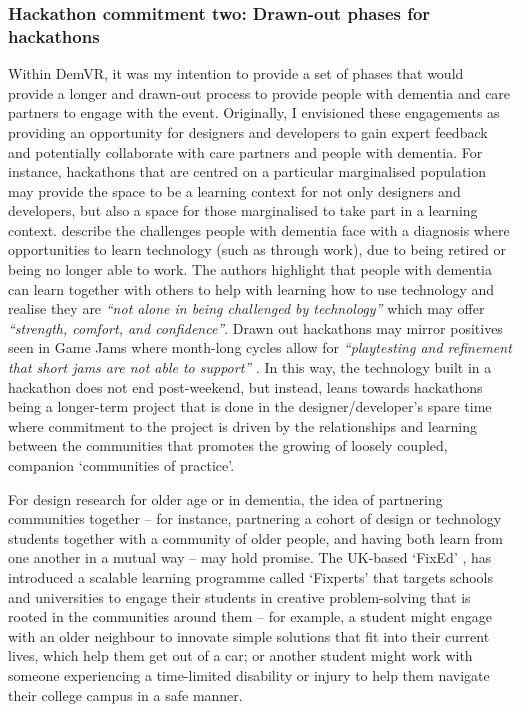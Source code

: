 \subsubsection{Hackathon commitment two: Drawn-out phases for hackathons}
\label{DiscussionThree:CommitTwo}
Within DemVR, it was my intention to provide a set of phases that would provide a longer and drawn-out process to provide people with dementia and care partners to engage with the event. Originally, I envisioned these engagements as providing an opportunity for designers and developers to gain expert feedback and potentially collaborate with care partners and people with dementia. For instance, hackathons that are centred on a particular marginalised population may provide the space to be a learning context for not only designers and developers, but also a space for those marginalised to take part in a learning context. \cite{rosenberg2012persons} describe the challenges people with dementia face with a diagnosis where opportunities to learn technology (such as through work), due to being retired or being no longer able to work. The authors highlight that people with dementia can learn together with others to help with learning how to use technology and realise they are \textit{``not alone in being challenged by technology''} which may offer \textit{``strength, comfort, and confidence''}. Drawn out hackathons may mirror positives seen in Game Jams where month-long cycles allow for \textit{``playtesting and refinement that short jams are not able to support''} \citep{faas2019jam}. In this way, the technology built in a hackathon does not end post-weekend, but instead, leans towards hackathons being a longer-term project that is done in the designer/developer’s spare time where commitment to the project is driven by the relationships and learning between the communities that promotes the growing of loosely coupled, companion `communities of practice'.

For design research for older age or in dementia, the idea of partnering communities together – for instance, partnering a cohort of design or technology students together with a community of older people, and having both learn from one another in a mutual way – may hold promise. The UK-based ‘FixEd’ \citep{noauthor_fixperts_nodate}, has introduced a scalable learning programme called `Fixperts' that targets schools and universities to engage their students in creative problem-solving that is rooted in the communities around them – for example, a student might engage with an older neighbour to innovate simple solutions that fit into their current lives, which help them get out of a car; or another student might work with someone experiencing a time-limited disability or injury to help them navigate their college campus in a safe manner. 

